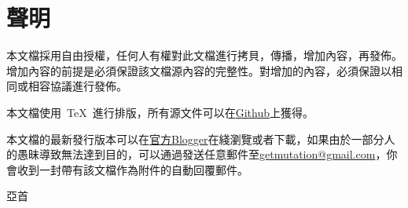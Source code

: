 \chapter{聲明}


本文檔採用自由授權，任何人有權對此文檔進行拷貝，傳播，增加內容，再發佈。增加內容的前提是必須保證該文檔源內容的完整性。對增加的內容，必須保證以相同或相容協議進行發佈。

本文檔使用~\TeX~進行排版，所有源文件可以在\href{http://www.github.com}{Github}上獲得。

本文檔的最新發行版本可以在\href{http://mutantion.blogspot.com}{官方Blogger}在綫瀏覽或者下載，如果由於一部分人的愚昧導致無法達到目的，可以通過發送任意郵件至\href{mailto:getmutation@gmail.com}{getmutation@gmail.com}，你會收到一封帶有該文檔作為附件的自動回覆郵件。

\begin{flushright}
亞首
\end{flushright}
